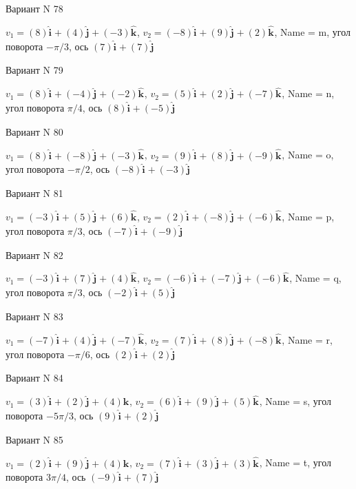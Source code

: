 \documentclass[11pt]{report}
\begin{document}
Вариант N 78

$v_1 = (8)\mathbf{\hat{i}_{}} + (4)\mathbf{\hat{j}_{}} + (-3)\mathbf{\hat{k}_{}}$, $v_2 = (-8)\mathbf{\hat{i}_{}} + (9)\mathbf{\hat{j}_{}} + (2)\mathbf{\hat{k}_{}}$, Name = m, угол поворота $- \pi / 3$, ось $(7)\mathbf{\hat{i}_{}} + (7)\mathbf{\hat{j}_{}}$

Вариант N 79

$v_1 = (8)\mathbf{\hat{i}_{}} + (-4)\mathbf{\hat{j}_{}} + (-2)\mathbf{\hat{k}_{}}$, $v_2 = (5)\mathbf{\hat{i}_{}} + (2)\mathbf{\hat{j}_{}} + (-7)\mathbf{\hat{k}_{}}$, Name = n, угол поворота $\pi / 4$, ось $(8)\mathbf{\hat{i}_{}} + (-5)\mathbf{\hat{j}_{}}$

Вариант N 80

$v_1 = (8)\mathbf{\hat{i}_{}} + (-8)\mathbf{\hat{j}_{}} + (-3)\mathbf{\hat{k}_{}}$, $v_2 = (9)\mathbf{\hat{i}_{}} + (8)\mathbf{\hat{j}_{}} + (-9)\mathbf{\hat{k}_{}}$, Name = o, угол поворота $- \pi / 2$, ось $(-8)\mathbf{\hat{i}_{}} + (-3)\mathbf{\hat{j}_{}}$

Вариант N 81

$v_1 = (-3)\mathbf{\hat{i}_{}} + (5)\mathbf{\hat{j}_{}} + (6)\mathbf{\hat{k}_{}}$, $v_2 = (2)\mathbf{\hat{i}_{}} + (-8)\mathbf{\hat{j}_{}} + (-6)\mathbf{\hat{k}_{}}$, Name = p, угол поворота $\pi / 3$, ось $(-7)\mathbf{\hat{i}_{}} + (-9)\mathbf{\hat{j}_{}}$

Вариант N 82

$v_1 = (-3)\mathbf{\hat{i}_{}} + (7)\mathbf{\hat{j}_{}} + (4)\mathbf{\hat{k}_{}}$, $v_2 = (-6)\mathbf{\hat{i}_{}} + (-7)\mathbf{\hat{j}_{}} + (-6)\mathbf{\hat{k}_{}}$, Name = q, угол поворота $\pi / 3$, ось $(-2)\mathbf{\hat{i}_{}} + (5)\mathbf{\hat{j}_{}}$

Вариант N 83

$v_1 = (-7)\mathbf{\hat{i}_{}} + (4)\mathbf{\hat{j}_{}} + (-7)\mathbf{\hat{k}_{}}$, $v_2 = (7)\mathbf{\hat{i}_{}} + (8)\mathbf{\hat{j}_{}} + (-8)\mathbf{\hat{k}_{}}$, Name = r, угол поворота $- \pi / 6$, ось $(2)\mathbf{\hat{i}_{}} + (2)\mathbf{\hat{j}_{}}$

Вариант N 84

$v_1 = (3)\mathbf{\hat{i}_{}} + (2)\mathbf{\hat{j}_{}} + (4)\mathbf{\hat{k}_{}}$, $v_2 = (6)\mathbf{\hat{i}_{}} + (9)\mathbf{\hat{j}_{}} + (5)\mathbf{\hat{k}_{}}$, Name = s, угол поворота $- 5 \pi / 3$, ось $(9)\mathbf{\hat{i}_{}} + (2)\mathbf{\hat{j}_{}}$

Вариант N 85

$v_1 = (2)\mathbf{\hat{i}_{}} + (9)\mathbf{\hat{j}_{}} + (4)\mathbf{\hat{k}_{}}$, $v_2 = (7)\mathbf{\hat{i}_{}} + (3)\mathbf{\hat{j}_{}} + (3)\mathbf{\hat{k}_{}}$, Name = t, угол поворота $3 \pi / 4$, ось $(-9)\mathbf{\hat{i}_{}} + (7)\mathbf{\hat{j}_{}}$
\end{document}
